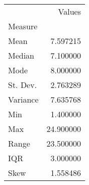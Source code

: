 \begin{tabu}{lr}
\toprule
 & Values \\
Measure &  \\
\midrule
Mean & 7.597215 \\
Median & 7.100000 \\
Mode & 8.000000 \\
St. Dev. & 2.763289 \\
Variance & 7.635768 \\
Min & 1.400000 \\
Max & 24.900000 \\
Range & 23.500000 \\
IQR & 3.000000 \\
Skew & 1.558486 \\
\bottomrule
\end{tabu}